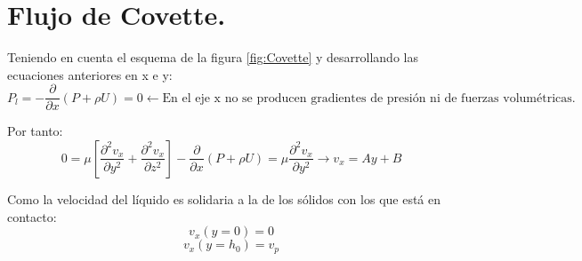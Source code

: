 \section{Flujo de Covette.}
Teniendo en cuenta el esquema de la figura \ref{fig:Covette} y desarrollando las ecuaciones anteriores en x e y:
\[P_l=-\dfrac{\partial}{\partial x}\left(P+\rho U\right)=0 \leftarrow \text{En el eje x no se producen gradientes de presión ni de fuerzas volumétricas.} \]


Por tanto:
\[0=\mu\left[\dfrac{\partial^2 v_x}{\partial y^2}+\dfrac{\partial^2 v_x}{\partial z^2}\right]-\dfrac{\partial}{\partial x}\left(P+\rho U\right) =\mu \dfrac{\partial^2 v_x}{\partial y^2} \rightarrow v_x=Ay+B\]


Como la velocidad del líquido es solidaria a la de los sólidos con los que está en contacto:
\[v_x(y=0)=0\]
\[v_x(y=h_0)=v_p\]


